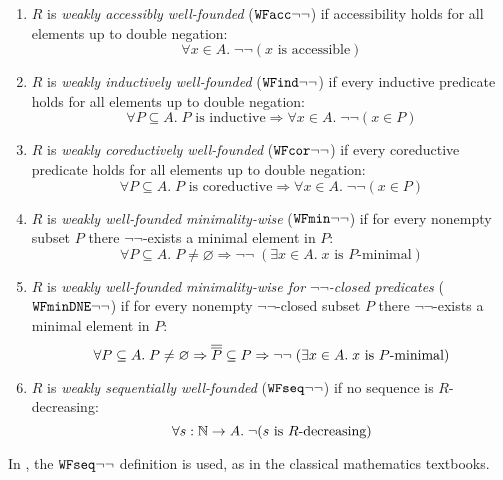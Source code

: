 \begin{definition} \label{def:WFweakproperties} \hfill 
  \begin{enumerate}
    \item $R$ is \emph{weakly accessibly well-founded} ($\mathtt{WFacc}{\lnot\lnot}$) if accessibility holds for all elements up to double negation:
      \[
        \forall x \in A.\; \lnot \lnot  (x \text{ is accessible})
      \]
    \item $R$ is \emph{weakly inductively well-founded} ($\mathtt{WFind}{\lnot\lnot}$) if every inductive predicate holds for all elements up to double negation:
      \[
        \forall P \subseteq A.\;\text{$P$ is inductive} \Rightarrow \forall x \in A.\; \lnot \lnot (x \in P)
      \]
    \item $R$ is \emph{weakly coreductively well-founded} ($\mathtt{WFcor}{\lnot\lnot}$) if every coreductive predicate holds for all elements up to double negation:
      \[
        \forall P \subseteq A.\;\text{$P$ is coreductive} \Rightarrow \forall x \in A.\; \lnot\lnot(x \in P)
      \]
    \item  $R$ is \emph{weakly well-founded minimality-wise} ($\mathtt{WFmin}{\lnot\lnot}$)
      if for every nonempty subset $P$ there $\lnot \lnot$-exists a minimal element in $P$:
      \[
        \forall P \subseteq A.\; P \neq \varnothing \Rightarrow \lnot \lnot \;
        (\exists x \in A.\; \text{$x$ is $P$-minimal})
      \]
    \item  $R$ is \emph{weakly well-founded minimality-wise for $\lnot \lnot$-closed predicates} ($\mathtt{WFminDNE}{\lnot\lnot}$)
      if for every nonempty $\lnot \lnot$-closed subset $P$ there $\lnot \lnot$-exists a minimal element in $P$:
      \[
        \forall P \subseteq A.\; P \neq \varnothing \Rightarrow \overline{\overline{P}} \subseteq P\Rightarrow \lnot \lnot \;
        (\exists x \in A.\; \text{$x$ is $P$-minimal})
      \]      
  \item $R$ is \emph{weakly sequentially well-founded} ($\mathtt{WFseq}{\lnot\lnot}$) if no sequence is $R$-decreasing:
    \[
      \forall s:\mathbb{N} \to A.\; \lnot \text{($s$ is $R$-decreasing)}
    \]
\end{enumerate} 
\end{definition}

In \cite{Terese}, the $\mathtt{WFseq}{\lnot\lnot}$ definition is used, as in the classical mathematics textbooks.

